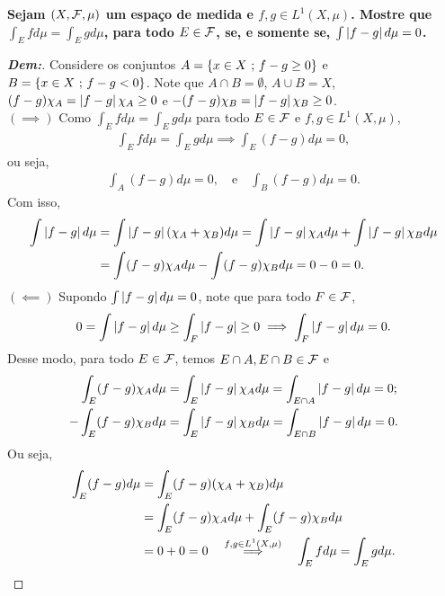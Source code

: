 \textbf{Sejam $(X, \mathcal F, \mu)$ um espaço de medida e $f, g \in L^1(X, \mu)$. 
Mostre que $\int_E f d\mu = \int_E g d\mu$, para todo $E \in \mathcal F$, se, 
e somente se, $\int \left|f - g\right| d\mu = 0$.} 
\begin{proof}[\textbf{Dem:}] Considere os conjuntos 
  $A = \left\{x \in X \text{ ; } f - g \ge 0\right\}$ e $B = \left\{x \in X \text{ ; } f - g < 0\right\}$.
  Note que $A \cap B = \emptyset$, $A \cup B = X$, $(f-g)\chi_A = \left|f-g\right|\chi_A \ge 0$
  e $-(f-g) \chi_B = \left|f-g\right|\chi_B \ge 0$.\\ 
  $(\implies)$ Como $\int_E f d\mu = \int_E g d\mu$ para todo $E \in \mathcal F$ 
  e $f, g \in L^1(X, \mu)$,
  \begin{align*}
    \int_E f d\mu = \int_E g d\mu \implies \int_E (f - g) d\mu = 0,
  \end{align*}
  ou seja, 
  \begin{align*}
    \int_A (f - g) d\mu = 0, \quad\text{e}\quad \int_B (f - g) d\mu =0.
  \end{align*}
  Com isso, 
  \begin{align*}
    \int \left|f - g\right| d\mu &= \int \left|f-g\right| (\chi_A + \chi_B) d\mu
    = \int \left|f-g\right|\chi_{A} d\mu + \int \left|f-g\right|\chi_{B} d\mu\\ 
    &= \int (f-g)\chi_{A} d\mu - \int (f-g)\chi_{B} d\mu = 0 - 0 = 0.
  \end{align*}
  $(\impliedby)$ Supondo $\int \left|f - g\right| d\mu = 0$, note que para 
  todo $F \in \mathcal F$,
  \begin{align*}
    0 = \int \left|f - g\right| d\mu \ge \int_F \left|f - g\right| \ge 0
    \implies \int_F \left|f - g\right| d\mu = 0.
  \end{align*}
  Desse modo, para todo $E \in \mathcal F$, temos $E \cap A, E \cap B \in \mathcal F$ e
  \begin{align*}
    \int_{E} (f - g)\chi_A d\mu &= \int_{E} \left|f - g\right| \chi_A d\mu = 
    \int_{E\cap A} \left|f - g\right| d\mu = 0; \\
    - \int_{E} (f - g)\chi_B d\mu &= \int_{E} \left|f - g\right| \chi_B d\mu = 
    \int_{E\cap B} \left|f - g\right| d\mu = 0.
  \end{align*}
  Ou seja, 
  \begin{align*}
    \int_E (f-g)d\mu &= \int_E (f-g)(\chi_A+\chi_B) d\mu\\ 
    &= \int_E (f-g)\chi_A d\mu 
    + \int_E (f-g)\chi_B d\mu\\ 
    &= 0 + 0 = 0 \quad\overset{f,g \in L^1(X, \mu)}{\implies}\quad \int_E fd\mu = \int_E gd\mu.
  \end{align*}
\end{proof}

